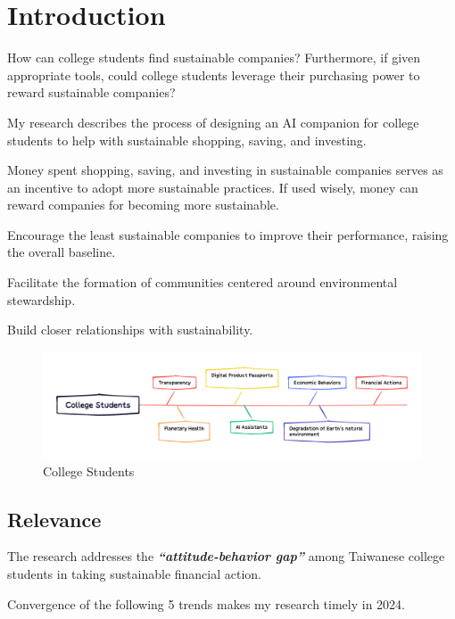\documentclass[
  letterpaper,
  DIV=11,
  numbers=noendperiod]{scrartcl}
\begin{document}
\newpage

\section{Introduction}\label{introduction}

How can college students find sustainable companies? Furthermore, if
given appropriate tools, could college students leverage their
purchasing power to reward sustainable companies?

My research describes the process of designing an AI companion for
college students to help with sustainable shopping, saving, and
investing.

Money spent shopping, saving, and investing in sustainable companies
serves as an incentive to adopt more sustainable practices. If used
wisely, money can reward companies for becoming more sustainable.

Encourage the least sustainable companies to improve their performance,
raising the overall baseline.

Facilitate the formation of communities centered around environmental
stewardship.

Build closer relationships with sustainability.

\begin{figure}[H]

{\centering \includegraphics[width=1\textwidth,height=\textheight]{./images/introduction/abstract.png}

}

\caption{College Students}

\end{figure}%

\subsection{Relevance}\label{relevance}

The research addresses the \textbf{\emph{``attitude-behavior gap''}}
among Taiwanese college students in taking sustainable financial action.

Convergence of the following 5 trends makes my research timely in 2024.
\end{document}
